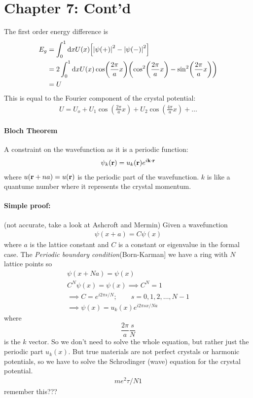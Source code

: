 \documentclass[../main.tex]{subfiles}
\begin{document}
\newpage 
{}

\section*{Chapter 7: Cont'd}
The first order energy difference is
\begin{align*}
    E_g &= \int_0^1 \dd x U(x) \qt[\abs{\psi(+)}^2 - \abs{\psi(-)}^2] \\
    &= 2 \int_0^1 \dd x U(x) \cos(\frac{2\pi}{a}x)
        \qt(\cos[2](\frac{2\pi}{a}x) - \sin[2](\frac{2\pi}{a}x)) \\
    &= U
\end{align*}
This is equal to the Fourier component of the crystal potential:
\begin{align*}
    U = U_o + U_1 \cos(\frac{2\pi}{a}x) + U_2 \cos(\frac{4\pi}{a}x) + \dots
\end{align*}

\paragraph*{Bloch Theorem} A constraint on the wavefunction as it is a periodic function:
\begin{align*}
    \psi_k(\vb r) = u_k(\vb r) e^{i\vb k \cdot \vb r}
\end{align*}
where $u(\vb r + na) = u(\vb r)$ is the periodic part of the wavefunction. $k$ is like a quantume
number where it represents the crystal momentum. 
\paragraph*{Simple proof:} (not accurate, take a look at Ashcroft and Mermin) Given a wavefunction
\begin{align*}
    \psi(x + a) = C \psi(x)
\end{align*}
where $a$ is the lattice constant and $C$ is a constant or eigenvalue in the formal case. The
\emph{Periodic boundary condition}(Born-Karman] we have a ring with $N$ lattice points so 
\begin{align*}
    \psi(x + Na) = \psi(x) \\
    C^N \psi(x) = \psi(x) \implies C^N = 1 \\
    \implies C = e^{i2\pi s/N}; \qquad s = 0, 1, 2, \dots, N-1 \\
    \implies \psi(x) = u_k(x) e^{i2\pi s x/Na}
\end{align*}
where \[\frac{2\pi}{a} \frac{s}{N}\] is the $k$ vector. So we don't need to solve the whole
equation, but rather just the periodic part $u_k(x)$. But true materials are not perfect crystals
or harmonic potentials, so we have to solve the Schrodinger (wave) equation for the crystal 
potential.
\begin{align*}
    m e^2 \tau / N1
\end{align*}
remember this???
\end{document}
